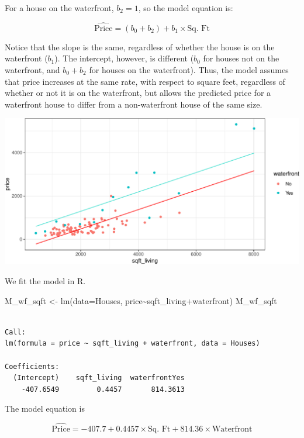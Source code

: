 \documentclass[
  letterpaper,
  DIV=11,
  numbers=noendperiod]{scrreprt}
\newenvironment{Shaded}{\begin{snugshade}}{\end{snugshade}}
\newcommand{\AttributeTok}[1]{\textcolor[rgb]{0.40,0.45,0.13}{#1}}
\newcommand{\FunctionTok}[1]{\textcolor[rgb]{0.28,0.35,0.67}{#1}}
\newcommand{\NormalTok}[1]{\textcolor[rgb]{0.00,0.23,0.31}{#1}}
\newcommand{\OtherTok}[1]{\textcolor[rgb]{0.00,0.23,0.31}{#1}}
\newcommand{\SpecialCharTok}[1]{\textcolor[rgb]{0.37,0.37,0.37}{#1}}
\begin{document}
For a house on the waterfront, \(b_2=1\), so the model equation is:

\[
\widehat{\text{Price}} = (b_0 + b_2) + b_1\times\text{Sq. Ft} 
\]

Notice that the slope is the same, regardless of whether the house is on
the waterfront (\(b_1\)). The intercept, however, is different (\(b_0\)
for houses not on the waterfront, and \(b_0 + b_2\) for houses on the
waterfront). Thus, the model assumes that price increases at the same
rate, with respect to square feet, regardless of whether or not it is on
the waterfront, but allows the predicted price for a waterfront house to
differ from a non-waterfront house of the same size.

\includegraphics{Ch2_files/figure-pdf/unnamed-chunk-12-1.pdf}

We fit the model in R.

\begin{Shaded}
\begin{Highlighting}[]
\NormalTok{M\_wf\_sqft }\OtherTok{\textless{}{-}} \FunctionTok{lm}\NormalTok{(}\AttributeTok{data=}\NormalTok{Houses, price}\SpecialCharTok{\textasciitilde{}}\NormalTok{sqft\_living}\SpecialCharTok{+}\NormalTok{waterfront)}
\NormalTok{M\_wf\_sqft}
\end{Highlighting}
\end{Shaded}

\begin{verbatim}

Call:
lm(formula = price ~ sqft_living + waterfront, data = Houses)

Coefficients:
  (Intercept)    sqft_living  waterfrontYes  
    -407.6549         0.4457       814.3613  
\end{verbatim}

The model equation is

\[
\widehat{\text{Price}} = -407.7 + 0.4457\times\text{Sq. Ft} + 814.36\times\text{Waterfront}
\]
\end{document}
